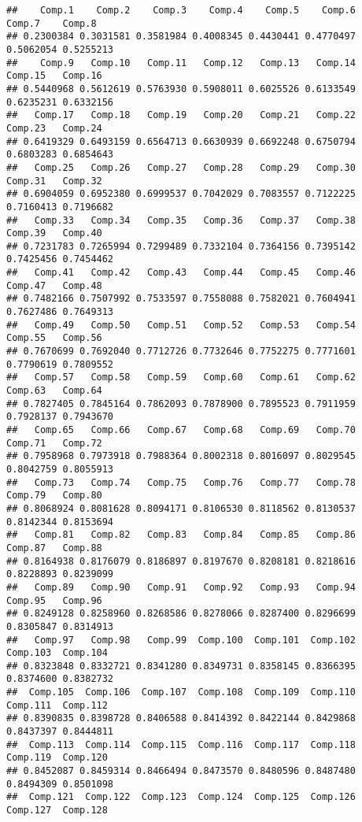 \documentclass[
]{article}
\begin{document}
\begin{verbatim}
##    Comp.1    Comp.2    Comp.3    Comp.4    Comp.5    Comp.6    Comp.7    Comp.8 
## 0.2300384 0.3031581 0.3581984 0.4008345 0.4430441 0.4770497 0.5062054 0.5255213 
##    Comp.9   Comp.10   Comp.11   Comp.12   Comp.13   Comp.14   Comp.15   Comp.16 
## 0.5440968 0.5612619 0.5763930 0.5908011 0.6025526 0.6133549 0.6235231 0.6332156 
##   Comp.17   Comp.18   Comp.19   Comp.20   Comp.21   Comp.22   Comp.23   Comp.24 
## 0.6419329 0.6493159 0.6564713 0.6630939 0.6692248 0.6750794 0.6803283 0.6854643 
##   Comp.25   Comp.26   Comp.27   Comp.28   Comp.29   Comp.30   Comp.31   Comp.32 
## 0.6904059 0.6952380 0.6999537 0.7042029 0.7083557 0.7122225 0.7160413 0.7196682 
##   Comp.33   Comp.34   Comp.35   Comp.36   Comp.37   Comp.38   Comp.39   Comp.40 
## 0.7231783 0.7265994 0.7299489 0.7332104 0.7364156 0.7395142 0.7425456 0.7454462 
##   Comp.41   Comp.42   Comp.43   Comp.44   Comp.45   Comp.46   Comp.47   Comp.48 
## 0.7482166 0.7507992 0.7533597 0.7558088 0.7582021 0.7604941 0.7627486 0.7649313 
##   Comp.49   Comp.50   Comp.51   Comp.52   Comp.53   Comp.54   Comp.55   Comp.56 
## 0.7670699 0.7692040 0.7712726 0.7732646 0.7752275 0.7771601 0.7790619 0.7809552 
##   Comp.57   Comp.58   Comp.59   Comp.60   Comp.61   Comp.62   Comp.63   Comp.64 
## 0.7827405 0.7845164 0.7862093 0.7878900 0.7895523 0.7911959 0.7928137 0.7943670 
##   Comp.65   Comp.66   Comp.67   Comp.68   Comp.69   Comp.70   Comp.71   Comp.72 
## 0.7958968 0.7973918 0.7988364 0.8002318 0.8016097 0.8029545 0.8042759 0.8055913 
##   Comp.73   Comp.74   Comp.75   Comp.76   Comp.77   Comp.78   Comp.79   Comp.80 
## 0.8068924 0.8081628 0.8094171 0.8106530 0.8118562 0.8130537 0.8142344 0.8153694 
##   Comp.81   Comp.82   Comp.83   Comp.84   Comp.85   Comp.86   Comp.87   Comp.88 
## 0.8164938 0.8176079 0.8186897 0.8197670 0.8208181 0.8218616 0.8228893 0.8239099 
##   Comp.89   Comp.90   Comp.91   Comp.92   Comp.93   Comp.94   Comp.95   Comp.96 
## 0.8249128 0.8258960 0.8268586 0.8278066 0.8287400 0.8296699 0.8305847 0.8314913 
##   Comp.97   Comp.98   Comp.99  Comp.100  Comp.101  Comp.102  Comp.103  Comp.104 
## 0.8323848 0.8332721 0.8341280 0.8349731 0.8358145 0.8366395 0.8374600 0.8382732 
##  Comp.105  Comp.106  Comp.107  Comp.108  Comp.109  Comp.110  Comp.111  Comp.112 
## 0.8390835 0.8398728 0.8406588 0.8414392 0.8422144 0.8429868 0.8437397 0.8444811 
##  Comp.113  Comp.114  Comp.115  Comp.116  Comp.117  Comp.118  Comp.119  Comp.120 
## 0.8452087 0.8459314 0.8466494 0.8473570 0.8480596 0.8487480 0.8494309 0.8501098 
##  Comp.121  Comp.122  Comp.123  Comp.124  Comp.125  Comp.126  Comp.127  Comp.128 

\end{verbatim}
\end{document}
